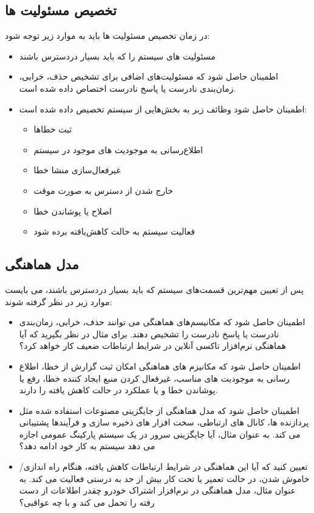 \subsection{تخصیص مسئولیت ها} 
در زمان تخصیص مسئولیت ها باید  به موارد زیر توجه شود:
\begin{itemize}
\item
مسئولیت های سیستم را که باید بسیار در‌دسترس باشند
\item
اطمینان حاصل شود که مسئولیت‌های اضافی برای تشخیص حذف، خرابی، زمان‌بندی نادرست یا پاسخ نادرست اختصاص داده شده است.
\item
اطمینان حاصل شود وظائف زیر به بخش‌هایی از سیستم تخصیص داده شده است:
\begin{itemize}
\item
ثبت خطا‌ها
\item
اطلاع‌رسانی به موجودیت های موجود در سیستم
\item
غیر‌فعال‌سازی منشا خطا
\item
خارج شدن از دسترس به صورت موقت
\item
اصلاح یا پوشاندن خطا
\item
فعالیت سیستم به حالت کاهش‌یافته  برده شود
\end{itemize}
\end{itemize}

\subsection{مدل هماهنگی}
پس از تعیین مهم‌ترین قسمت‌های سیستم که باید بسیار در‌دسترس باشند، می بایست موارد زیر در نظر گرفته شوند:
\begin{itemize}
\item
اطمینان حاصل شود که مکانیسم‌های هماهنگی می توانند حذف، خرابی، زمان‌بندی نادرست یا پاسخ نادرست را تشخیص دهند. برای مثال در نظر بگیرید که آیا هماهنگی نرم‌افزار تاکسی آنلاین در شرایط ارتباطات ضعیف کار خواهد کرد؟
\item
اطمینان حاصل شود که مکانیزم های هماهنگی امکان ثبت گزارش از خطا، اطلاع رسانی به موجودیت های مناسب، غیرفعال کردن منبع ایجاد کننده خطا، رفع یا پوشاندن خطا و یا عملکرد در حالت کاهش یافته را دارند.
\item
اطمینان حاصل شود که مدل هماهنگی از جایگزینی مصنوعات استفاده شده مثل پردازنده ها، کانال های ارتباطی، سخت افزار های ذخیره سازی و فرآیندها پشتیبانی می کند. به عنوان مثال، آیا جایگزینی سرور در یک سیستم پارکینگ عمومی اجازه می دهد سیستم به کار خود ادامه دهد؟
\item
تعیین کنید که آیا این هماهنگی در شرایط ارتباطات کاهش یافته، هنگام راه اندازی/ خاموش شدن، در حالت تعمیر یا تحت کار بیش از حد به درستی فعالیت می کند. به عنوان مثال، مدل هماهنگی در نرم‌افزار اشتراک خودرو چقدر اطلاعات از دست رفته را تحمل می کند و با چه عواقبی؟
\end{itemize}

